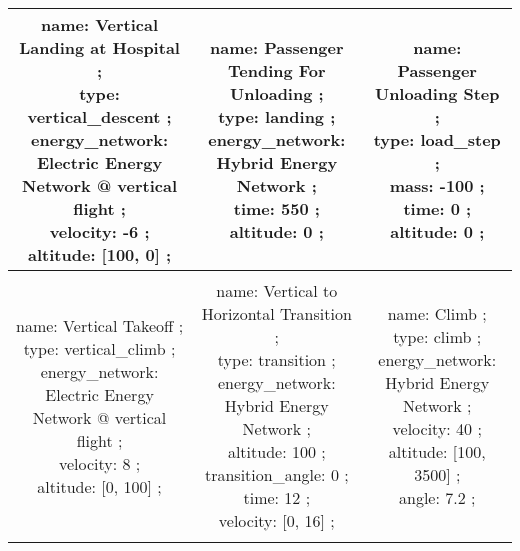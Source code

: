 \begin{table}[h]
\begin{adjustbox}{width=1\textwidth}
\begin{tabular}{|c|c|c|}
\makecell{name: Vertical Landing at Hospital ; \\ type: vertical\_descent ; \\ energy\_network: Electric Energy Network @ vertical flight ; \\ velocity: -6 ; \\ altitude: [100, 0] ; \\ } & \makecell{name: Passenger Tending For Unloading ; \\ type: landing ; \\ energy\_network: Hybrid Energy Network ; \\ time: 550 ; \\ altitude: 0 ; \\ } & \makecell{name: Passenger Unloading Step ; \\ type: load\_step ; \\ mass: -100 ; \\ time: 0 ; \\ altitude: 0 ; \\ }\\ \hline \\ 
\makecell{name: Vertical Takeoff ; \\ type: vertical\_climb ; \\ energy\_network: Electric Energy Network @ vertical flight ; \\ velocity: 8 ; \\ altitude: [0, 100] ; \\ } & \makecell{name: Vertical to Horizontal Transition ; \\ type: transition ; \\ energy\_network: Hybrid Energy Network ; \\ altitude: 100 ; \\ transition\_angle: 0 ; \\ time: 12 ; \\ velocity: [0, 16] ; \\ } & \makecell{name: Climb ; \\ type: climb ; \\ energy\_network: Hybrid Energy Network ; \\ velocity: 40 ; \\ altitude: [100, 3500] ; \\ angle: 7.2 ; \\ }\\ \hline \\ 

\end{tabular}
\end{adjustbox}
\end{table}
